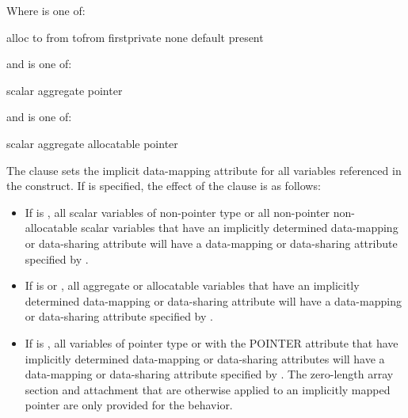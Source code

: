 Where  is one of:
\begin{indentedcodelist}
  alloc
  to
  from
  tofrom
  firstprivate
  none
  default
  present
\end{indentedcodelist}

\begin{ccppspecific}
and  is one of:
\begin{indentedcodelist}
  scalar
  aggregate
  pointer
\end{indentedcodelist}
\end{ccppspecific}

\begin{fortranspecific}
and  is one of:
\begin{indentedcodelist}
  scalar
  aggregate
  allocatable
  pointer
\end{indentedcodelist}
\end{fortranspecific}

\descr
The  clause sets the implicit data-mapping attribute for 
all variables referenced in the construct. If  is 
specified, the effect of the  clause is as follows:

\begin{itemize}
\item If  is , all scalar variables of
      non-pointer type or all non-pointer non-allocatable scalar variables that
      have an implicitly determined data-mapping or data-sharing attribute will
      have a data-mapping or data-sharing attribute specified by
      .
\item If  is  or ,
      all aggregate or allocatable variables that have an implicitly determined
      data-mapping or data-sharing attribute will have a data-mapping or
      data-sharing attribute specified by .
\item If  is , all variables of pointer
      type or with the POINTER attribute that have implicitly determined
      data-mapping or data-sharing attributes will have a data-mapping or
      data-sharing attribute specified by .  The
      zero-length array section and attachment that are otherwise applied to
      an implicitly mapped pointer are only provided for the  behavior.
\end{itemize}


